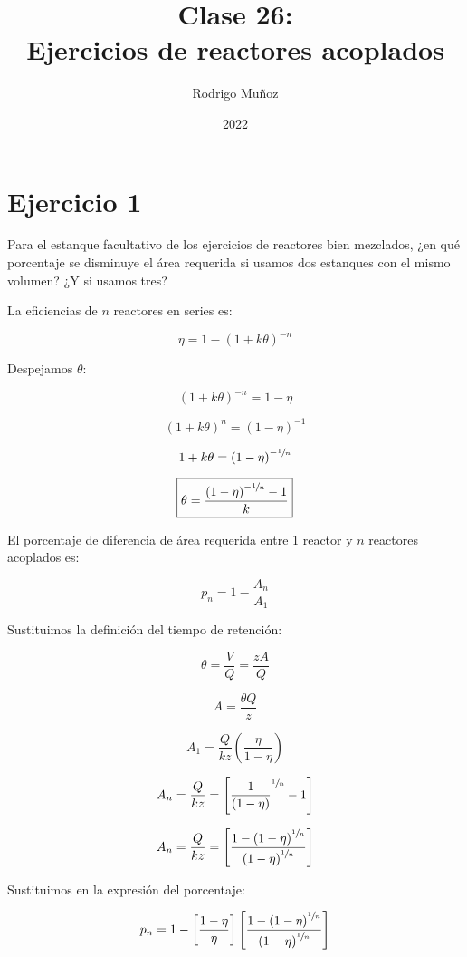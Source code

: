 \documentclass[11pt]{article}
\title{Clase 26: \\ Ejercicios de reactores acoplados}
\author{Rodrigo Muñoz}
\date{2022}
\begin{document}
\maketitle

\section{Ejercicio 1}

Para el estanque facultativo de los ejercicios de reactores bien mezclados, ¿en qué porcentaje se disminuye el área requerida si usamos dos estanques con el mismo volumen? ¿Y si usamos tres?

\bigskip \bigskip

La eficiencias de \( n \) reactores en series es:

\[ \eta = 1 - \left( 1 + k \theta \right) ^ {-n} \]

Despejamos \( \theta \):

\[ \left( 1 + k \theta \right) ^ {-n} = 1 - \eta \]

\[ \left( 1 + k \theta \right) ^ n = \left( 1 - \eta \right) ^ {-1} \]

\[ 1 + k \theta = \left( 1 - \eta \right) ^ { - \sfrac{1}{n} } \]

\[ \boxed{ \theta = \frac{ \left( 1 - \eta \right) ^ { - \sfrac{1}{n} } - 1 }{ k } } \]

El porcentaje de diferencia de área requerida entre 1 reactor y \( n \) reactores acoplados es:

\[ p_n = 1 - \frac{A_n}{A_1} \]

Sustituimos la definición del tiempo de retención:

\[ \theta = \frac{V}{Q} = \frac{ z A }{Q} \]

\[ A = \frac{ \theta Q }{z} \]

\[ A_1 = \frac{Q}{ k z } \left( \frac{ \eta }{ 1 - \eta } \right) \]

\[ A_n = \frac{Q}{ k z } = \left[ \frac{1}{ \left( 1 - \eta \right) } ^ { \sfrac{1}{n} } - 1 \right] \]

\[ A_n = \frac{Q}{ k z } = \left[ \frac{ 1 - \left( 1 - \eta \right) ^ { \sfrac{1}{n} } }{ \left( 1 - \eta \right)  ^ { \sfrac{1}{n} } } \right] \]

Sustituimos en la expresión del porcentaje:

\[ p_n = 1 - \left[ \frac{ 1 - \eta }{ \eta } \right] \left[ \frac{ 1 - \left( 1 - \eta \right) ^ { \sfrac{1}{n} } }{ \left( 1 - \eta \right)  ^ { \sfrac{1}{n} } } \right] \]
\end{document}

